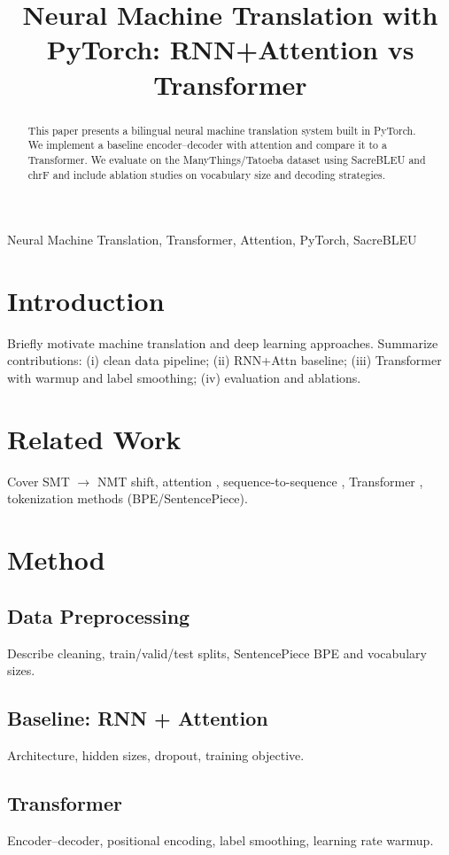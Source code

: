 \documentclass[conference]{IEEEtran}
\title{Neural Machine Translation with PyTorch: RNN+Attention vs Transformer}
\author{\IEEEauthorblockN{Your Name}
\IEEEauthorblockA{\textit{Department of Informatics} \\
\textit{Your University}\\
City, Country \\
youremail@domain.com}
}
\begin{document}
\maketitle

\begin{abstract}
This paper presents a bilingual neural machine translation system built in PyTorch. We implement a baseline encoder--decoder with attention and compare it to a Transformer. We evaluate on the ManyThings/Tatoeba dataset using SacreBLEU and chrF and include ablation studies on vocabulary size and decoding strategies.
\end{abstract}

\begin{IEEEkeywords}
Neural Machine Translation, Transformer, Attention, PyTorch, SacreBLEU
\end{IEEEkeywords}

\section{Introduction}
Briefly motivate machine translation and deep learning approaches. Summarize contributions: (i) clean data pipeline; (ii) RNN+Attn baseline; (iii) Transformer with warmup and label smoothing; (iv) evaluation and ablations.

\section{Related Work}
Cover SMT $\rightarrow$ NMT shift, attention \cite{bahdanau2014neural}, sequence-to-sequence \cite{sutskever2014sequence}, Transformer \cite{vaswani2017attention}, tokenization methods (BPE/SentencePiece).

\section{Method}
\subsection{Data Preprocessing}
Describe cleaning, train/valid/test splits, SentencePiece BPE and vocabulary sizes.

\subsection{Baseline: RNN + Attention}
Architecture, hidden sizes, dropout, training objective.

\subsection{Transformer}
Encoder--decoder, positional encoding, label smoothing, learning rate warmup.
\end{document}
